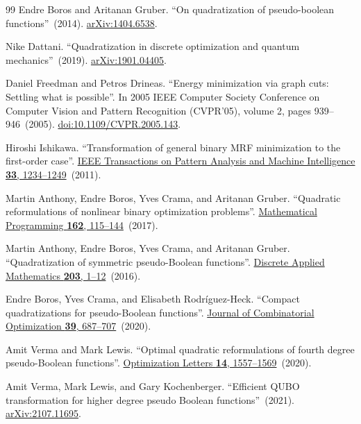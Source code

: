 \documentclass[a4paper,onecolumn,11pt,unpublished]{quantumarticle}
\theoremstyle{remark}
\begin{document}
\begin{thebibliography}{99}
Endre Boros and Aritanan Gruber.
\newblock ``On quadratization of pseudo-boolean functions''~(2014).
\newblock \href{http://arxiv.org/abs/1404.6538}{arXiv:1404.6538}.

Nike Dattani.
\newblock ``Quadratization in discrete optimization and quantum mechanics''~(2019).
\newblock \href{http://arxiv.org/abs/1901.04405}{arXiv:1901.04405}.

Daniel Freedman and Petros Drineas.
\newblock ``Energy minimization via graph cuts: Settling what is possible''.
\newblock In 2005 IEEE Computer Society Conference on Computer Vision and Pattern Recognition (CVPR'05), volume 2, pages 939--946~(2005).
\newblock \href{https://dx.doi.org/10.1109/CVPR.2005.143}{doi:10.1109/CVPR.2005.143}.

Hiroshi Ishikawa.
\newblock ``Transformation of general binary MRF minimization to the first-order case''.
\newblock \href{https://dx.doi.org/10.1109/TPAMI.2010.91}{IEEE Transactions on Pattern Analysis and Machine Intelligence {\bf 33}, 1234--1249}~(2011).

Martin Anthony, Endre Boros, Yves Crama, and Aritanan Gruber.
\newblock ``Quadratic reformulations of nonlinear binary optimization problems''.
\newblock \href{https://dx.doi.org/10.1007/s10107-016-1032-4}{Mathematical Programming {\bf 162}, 115--144}~(2017).

Martin Anthony, Endre Boros, Yves Crama, and Aritanan Gruber.
\newblock ``Quadratization of symmetric pseudo-Boolean functions''.
\newblock \href{https://doi.org/10.1016/j.dam.2016.01.001}{Discrete Applied Mathematics {\bf 203}, 1--12}~(2016).


Endre Boros, Yves Crama, and Elisabeth Rodr{\'i}guez-Heck.
\newblock ``Compact quadratizations for pseudo-Boolean functions''.
\newblock \href{https://dx.doi.org/10.1007/s10878-019-00511-0}{Journal of Combinatorial Optimization {\bf 39}, 687--707}~(2020).

Amit Verma and Mark Lewis.
\newblock ``Optimal quadratic reformulations of fourth degree pseudo-Boolean functions''.
\newblock \href{https://dx.doi.org/10.1007/s11590-019-01460-7}{Optimization Letters {\bf 14}, 1557--1569}~(2020).

Amit Verma, Mark Lewis, and Gary Kochenberger.
\newblock ``Efficient QUBO transformation for higher degree pseudo Boolean functions''~(2021).
\newblock \href{http://arxiv.org/abs/2107.11695}{arXiv:2107.11695}.


\end{thebibliography}
\end{document}
